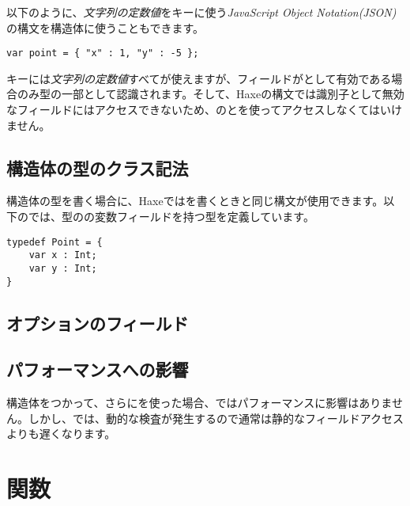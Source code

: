 以下のように、\emph{文字列の定数値}をキーに使う\emph{JavaScript Object Notation(JSON)}の構文を構造体に使うこともできます。

\begin{lstlisting}
var point = { "x" : 1, "y" : -5 };
\end{lstlisting}

キーには\emph{文字列の定数値}すべてが使えますが、フィールドがとして有効である場合のみ型の一部として認識されます。そして、Haxeの構文では識別子として無効なフィールドにはアクセスできないため、のとを使ってアクセスしなくてはいけません。

\subsection{構造体の型のクラス記法}
\label{types-structure-class-notation}

構造体の型を書く場合に、Haxeではを書くときと同じ構文が使用できます。以下のでは、型のの変数フィールドを持つ型を定義しています。

\begin{lstlisting}
typedef Point = {
    var x : Int;
    var y : Int;
}
\end{lstlisting}

\subsection{オプションのフィールド}
\label{types-structure-optional-fields}


\subsection{パフォーマンスへの影響}
\label{types-structure-performance}

構造体をつかって、さらにを使った場合、ではパフォーマンスに影響はありません。しかし、では、動的な検査が発生するので通常は静的なフィールドアクセスよりも遅くなります。

\section{関数}
\label{types-function}

